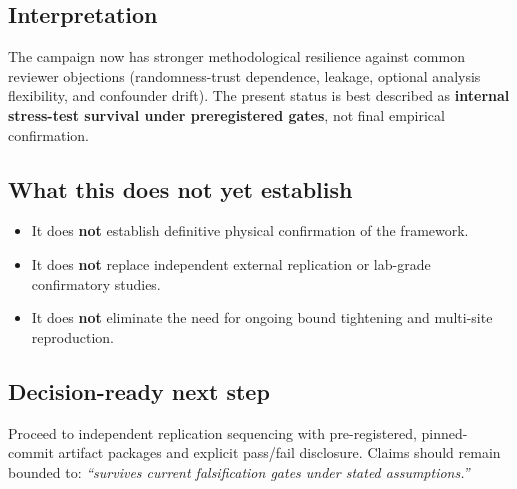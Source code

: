 \subsection*{Interpretation}
The campaign now has stronger methodological resilience against common reviewer objections (randomness-trust dependence, leakage, optional analysis flexibility, and confounder drift). The present status is best described as \textbf{internal stress-test survival under preregistered gates}, not final empirical confirmation.

\subsection*{What this does not yet establish}
\begin{itemize}
    \item It does \textbf{not} establish definitive physical confirmation of the framework.
    \item It does \textbf{not} replace independent external replication or lab-grade confirmatory studies.
    \item It does \textbf{not} eliminate the need for ongoing bound tightening and multi-site reproduction.
\end{itemize}

\subsection*{Decision-ready next step}
Proceed to independent replication sequencing with pre-registered, pinned-commit artifact packages and explicit pass/fail disclosure. Claims should remain bounded to: \textit{``survives current falsification gates under stated assumptions.''}

